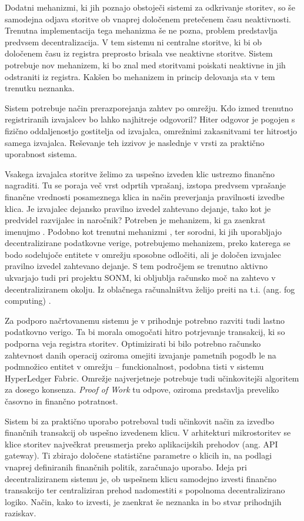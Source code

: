 \documentclass[a4paper, 12pt]{book}
\begin{document}
Dodatni mehanizmi, ki jih poznajo obstoječi sistemi za odkrivanje storitev, so še samodejna odjava storitve ob vnaprej določenem pretečenem času neaktivnosti.
Trenutna implementacija tega mehanizma še ne pozna, problem predstavlja predvsem decentralizacija.
V tem sistemu ni centralne storitve, ki bi ob določenem času iz registra preprosto brisala vse neaktivne storitve.
Sistem potrebuje nov mehanizem, ki bo znal med storitvami poiskati neaktivne in jih odstraniti iz registra.
Kakšen bo mehanizem in princip delovanja sta v tem trenutku neznanka.

Sistem potrebuje način prerazporejanja zahtev po omrežju.
Kdo izmed trenutno registriranih izvajalcev bo lahko najhitreje odgovoril?
Hiter odgovor je pogojen s fizično oddaljenostjo gostitelja od izvajalca, omrežnimi zakasnitvami ter hitrostjo samega izvajalca. Reševanje teh izzivov je naslednje v vrsti za praktično uporabnost sistema.


Vsakega izvajalca storitve želimo za uspešno izveden klic ustrezno finančno nagraditi. Tu se poraja več vrst odprtih vprašanj, izstopa predvsem vprašanje finančne vrednosti posameznega klica in način preverjanja pravilnosti izvedbe klica.
Je izvajalec dejansko pravilno izvedel zahtevano dejanje, tako kot je predvidel razvijalec in naročnik?
Potreben je mehanizem, ki ga zaenkrat imenujmo .
Podobno kot trenutni mehanizmi ,  ter sorodni, ki jih uporabljajo decentralizirane podatkovne verige, potrebujemo mehanizem, preko katerega se bodo sodelujoče entitete v omrežju sposobne odločiti, ali je določen izvajalec pravilno izvedel zahtevano dejanje.
S tem področjem se trenutno aktivno ukvarjajo tudi pri projektu SONM, ki obljublja računsko moč na zahtevo v decentraliziranem okolju. Iz oblačnega računalništva želijo preiti na t.i.  (ang. fog computing) \cite{Sonm}.

Za podporo načrtovanemu sistemu je v prihodnje potrebno razviti tudi lastno podatkovno verigo.
Ta bi morala omogočati hitro potrjevanje transakcij, ki so podporna veja registra storitev.
Optimizirati bi bilo potrebno računsko zahtevnost danih operacij oziroma omejiti izvajanje pametnih pogodb le na podmnožico entitet v omrežju -- funckionalnost, podobna tisti v sistemu HyperLedger Fabric.
Omrežje najverjetneje potrebuje tudi učinkovitejši algoritem za dosego konsenza.
\textit{Proof of Work} tu odpove, oziroma predstavlja preveliko časovno in finančno potratnost.

Sistem bi za praktično uporabo potreboval tudi učinkovit način za izvedbo finančnih transakcij ob uspešno izvedenem klicu.
V arhitekturi mikrostoritev se klice storitev največkrat preusmerja preko aplikacijskih prehodov (ang. API gateway).
Ti zbirajo določene statistične parametre o klicih in, na podlagi vnaprej definiranih finančnih politik, zaračunajo uporabo.
Ideja pri decentraliziranem sistemu je, ob uspešnem klicu samodejno izvesti finančno transakcijo ter centraliziran prehod nadomestiti s popolnoma decentralizirano logiko.
Način, kako to izvesti, je zaenkrat še neznanka in bo stvar prihodnjih raziskav.
\end{document}
